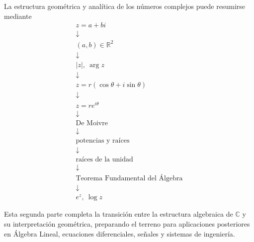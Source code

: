 La estructura geométrica y analítica de los números complejos puede resumirse
mediante
\[
\boxed{
\begin{array}{c}
z=a+bi
\\[0.2cm]
\downarrow
\\[0.2cm]
(a,b)\in\mathbb{R}^2
\\[0.2cm]
\downarrow
\\[0.2cm]
|z|,\ \arg z
\\[0.2cm]
\downarrow
\\[0.2cm]
z=r(\cos\theta+i\sin\theta)
\\[0.2cm]
\downarrow
\\[0.2cm]
z=re^{i\theta}
\\[0.2cm]
\downarrow
\\[0.2cm]
\text{De Moivre}
\\[0.2cm]
\downarrow
\\[0.2cm]
\text{potencias y raíces}
\\[0.2cm]
\downarrow
\\[0.2cm]
\text{raíces de la unidad}
\\[0.2cm]
\downarrow
\\[0.2cm]
\text{Teorema Fundamental del Álgebra}
\\[0.2cm]
\downarrow
\\[0.2cm]
e^z,\ \log z
\end{array}
}
\]

Esta segunda parte completa la transición entre la estructura algebraica de
$\mathbb{C}$ y su interpretación geométrica, preparando el terreno para
aplicaciones posteriores en Álgebra Lineal, ecuaciones diferenciales, señales
y sistemas de ingeniería.
